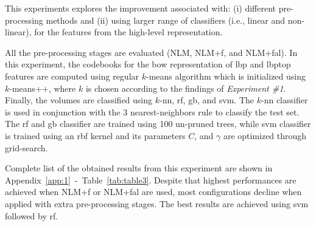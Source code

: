 This experiments explores the improvement associated with: (i) different pre-processing methods and (ii) using larger range of classifiers (i.e., linear and non-linear), for the features from the high-level representation.

All the pre-processing stages are evaluated (NLM, NLM+\acs{f}, and NLM+\acs{fal}).
In this experiment, the codebooks for the \ac{bow} representation of \ac{lbp} and \ac{lbptop} features are computed using regular $k$-means algorithm which is initialized using $k$-means++, where $k$ is chosen according to the findings of \emph{Experiment \#1}.
Finally, the volumes are classified using $k$-\ac{nn}, \ac{rf}, \ac{gb}, and \ac{svm}.
The $k$-\ac{nn} classifier is used in conjunction with the 3 nearest-neighbors rule to classify the test set.
The \ac{rf} and \ac{gb} classifier are trained using 100 un-pruned trees, while \ac{svm} classifier is trained using an \ac{rbf} kernel and its parameters $C$, and $\gamma$ are optimized through grid-search.

Complete list of the obtained results from this experiment are shown in Appendix~\ref{app:1}~-~Table~\ref{tab:table3}.
Despite that highest performances are achieved when NLM+\acs{f} or NLM+\acs{fal} are used, most configurations decline when applied with extra pre-processing stages.
The best results are achieved using \ac{svm} followed by \ac{rf}.

